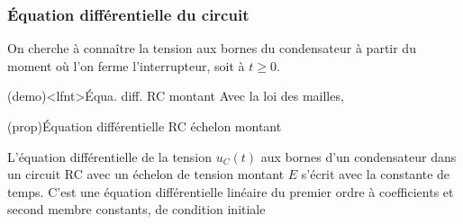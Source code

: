 \documentclass[../../main/main.tex]{subfiles}
\begin{document}
\subsubsection{Équation différentielle du circuit}
On cherche à connaître la tension aux bornes du condensateur à partir du moment
où l’on ferme l’interrupteur, soit à $t \geq 0$.
\begin{tcb}[label=demo:eqdiffrc](demo)<lfnt>{Équa. diff. RC montant}
	Avec la loi des mailles,
	\vspace{-15pt}
\end{tcb}
\begin{tcb}[label=prop:eqdiffrc, sidebyside, righthand ratio=.4](prop){Équation
			différentielle RC échelon montant}

	L'équation différentielle de la tension $u_C(t)$ aux bornes d'un condensateur
	dans un circuit RC avec un échelon de tension montant $E$ s'écrit
	\psw{
		\[
			\boxed{\dv{u_C}{t} + \frac{1}{\tau}u_C = \frac{E}{\tau}}
		\]
	}
	avec  la constante de temps.
	\tcblower
	C'est une équation différentielle linéaire du premier ordre à
	coefficients et second membre constants, de condition initiale
	\psw{
		\[
			\boxed{u_C(0^-) = u_C(0^+) = 0}
		\]
	}
\end{tcb}
\end{document}
